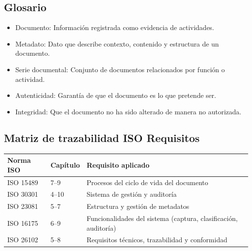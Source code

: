 \documentclass[12pt,a4paper]{article}
\begin{document}
\subsection{Glosario}
\begin{itemize}
    \item Documento: Información registrada como evidencia de actividades.
    \item Metadato: Dato que describe contexto, contenido y estructura de un documento.
    \item Serie documental: Conjunto de documentos relacionados por función o actividad.
    \item Autenticidad: Garantía de que el documento es lo que pretende ser.
    \item Integridad: Que el documento no ha sido alterado de manera no autorizada.
\end{itemize}

\subsection{Matriz de trazabilidad ISO Requisitos}
\begin{longtable}{p{3cm}p{3cm}p{8cm}}
\toprule
\textbf{Norma ISO} & \textbf{Capítulo} & \textbf{Requisito aplicado} \\
\midrule
ISO 15489 & 7–9 & Procesos del ciclo de vida del documento \\
ISO 30301 & 4–10 & Sistema de gestión y auditoría \\
ISO 23081 & 5–7 & Estructura y gestión de metadatos \\
ISO 16175 & 6–9 & Funcionalidades del sistema (captura, clasificación, auditoría) \\
ISO 26102 & 5–8 & Requisitos técnicos, trazabilidad y conformidad \\
\bottomrule
\end{longtable}
\end{document}
